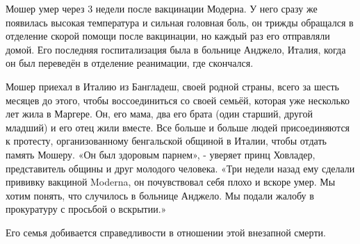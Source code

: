 Мошер умер через 3 недели после вакцинации Модерна. У него сразу же появилась
высокая температура и сильная головная боль, он трижды обращался в отделение
скорой помощи после вакцинации, но каждый раз его отправляли домой. Его
последняя госпитализация была в больнице Анджело, Италия, когда он был переведён
в отделение реанимации, где скончался.

Мошер приехал в Италию из Бангладеш, своей родной страны, всего за шесть месяцев
до этого, чтобы воссоединиться со своей семьёй, которая уже несколько лет жила в
Маргере. Он, его мама, два его брата (один старший, другой младший) и его отец
жили вместе.  Все больше и больше людей присоединяются к протесту,
организованному бенгальской общиной в Италии, чтобы отдать память Мошеру. «Он
был здоровым парнем», - уверяет принц Ховладер, представитель общины и друг
молодого человека. «Три недели назад ему сделали прививку вакциной Moderna, он
почувствовал себя плохо и вскоре умер. Мы хотим понять, что случилось в больнице
Анджело. Мы подали жалобу в прокуратуру с просьбой о вскрытии.»

Его семья добивается справедливости в отношении этой внезапной смерти.
